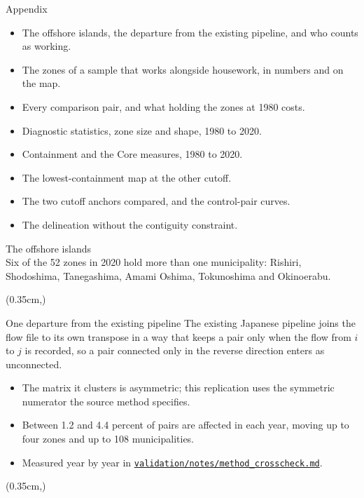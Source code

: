 \documentclass[aspectratio=169,11pt]{beamer}
\newcommand{\repo}{https://github.com/daisukeadachi/commuting_zone_japan/blob/main}
\newcommand{\filelink}[1]{\href{\repo/#1}{\texttt{#1}}}
\newcommand{\slidebuttons}[1]{%
  \begin{textblock*}{\dimexpr\paperwidth-0.7cm\relax}(0.35cm,\dimexpr\paperheight-0.66cm\relax)
    \raggedleft #1%
  \end{textblock*}}
\newcommand{\backslide}[1]{\slidebuttons{\hyperlink{#1}{\beamerreturnbutton{Back}}}}
\begin{document}
\clearpage
\appendix

\begin{frame}[plain]
  \vfill
  \centering
  {\Huge Appendix}
  \vfill
  \begin{itemize}
    \item The offshore islands, the departure from the existing pipeline, and who counts as working.
    \item The zones of a sample that works alongside housework, in numbers and on the map.
    \item Every comparison pair, and what holding the zones at 1980 costs.
    \item Diagnostic statistics, zone size and shape, 1980 to 2020.
    \item Containment and the Core measures, 1980 to 2020.
    \item The lowest-containment map at the other cutoff.
    \item The two cutoff anchors compared, and the control-pair curves.
    \item The delineation without the contiguity constraint.
  \end{itemize}
  \vfill
\end{frame}

\begin{frame}[label=appislands]{The offshore islands}
  \centering
  {\setlength{\tabcolsep}{4pt}}
  \\[4pt]
  \footnotesize Six of the 52 zones in 2020 hold more than one municipality: Rishiri, Shodoshima, Tanegashima, Amami Oshima, Tokunoshima and Okinoerabu.
  \backslide{delineation}
\end{frame}

\begin{frame}[label=appdeparture]{One departure from the existing pipeline}
  The existing Japanese pipeline joins the flow file to its own transpose in a way that keeps a pair only when the flow from $i$ to $j$ is recorded, so a pair connected only in the reverse direction enters as unconnected.
  \vfill
  \begin{itemize}
    \item The matrix it clusters is asymmetric; this replication uses the symmetric numerator the source method specifies.
    \item Between 1.2 and 4.4 percent of pairs are affected in each year, moving up to four zones and up to 108 municipalities.
    \item Measured year by year in \filelink{validation/notes/method\_crosscheck.md}.
  \end{itemize}
  \backslide{delineation}
\end{frame}
\end{document}
